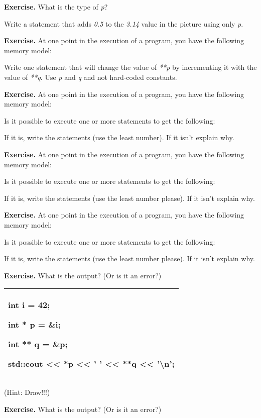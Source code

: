 \documentclass[
]{article}
\begin{document}
\textbf{Exercise.} What is the type of \emph{p}?

Write a statement that adds \emph{0.5} to the \emph{3.14} value in the
picture using only \emph{p}.

\textbf{Exercise.} At one point in the execution of a program, you have
the following memory model:

Write one statement that will change the value of \emph{**p} by
incrementing it with the value of \emph{**q}. Use \emph{p} and \emph{q}
and not hard-coded constants.

\textbf{Exercise.} At one point in the execution of a program, you have
the following memory model:

Is it possible to execute one or more statements to get the following:

If it is, write the statements (use the least number). If it isn't
explain why.

\textbf{Exercise.} At one point in the execution of a program, you have
the following memory model:

Is it possible to execute one or more statements to get the following:

If it is, write the statements (use the least number please). If it
isn't explain why.

\textbf{Exercise.} At one point in the execution of a program, you have
the following memory model:

Is it possible to execute one or more statements to get the following:

If it is, write the statements (use the least number please). If it
isn't explain why.

\textbf{Exercise.} What is the output? (Or is it an error?)

\begin{longtable}[]{@{}l@{}}
\toprule
\endhead
\begin{minipage}[t]{0.97\columnwidth}\raggedright
int i = 42;

int * p = \&i;

int ** q = \&p;

std::cout \textless\textless{} *p \textless\textless{} ' '
\textless\textless{} **q \textless\textless{} '\textbackslash n'; \strut
\end{minipage}\tabularnewline
\bottomrule
\end{longtable}

(Hint: Draw!!!)

\textbf{Exercise.} What is the output? (Or is it an error?)
\end{document}
